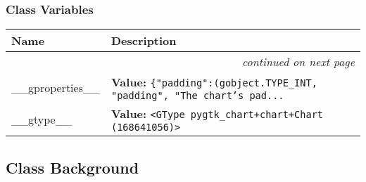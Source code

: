 
  \subsubsection{Class Variables}

    \vspace{-1cm}
\hspace{\varindent}\begin{longtable}{|p{\varnamewidth}|p{\vardescrwidth}|l}
\cline{1-2}
\cline{1-2} \centering \textbf{Name} & \centering \textbf{Description}& \\
\cline{1-2}
\endhead\cline{1-2}\multicolumn{3}{r}{\small\textit{continued on next page}}\\\endfoot\cline{1-2}
\endlastfoot\raggedright \_\-\_\-g\-p\-r\-o\-p\-e\-r\-t\-i\-e\-s\-\_\-\_\- & \raggedright \textbf{Value:} 
{\tt \{"padding":(gobject.TYPE\_INT, "padding", "The chart's pad\texttt{...}}&\\
\cline{1-2}
\raggedright \_\-\_\-g\-t\-y\-p\-e\-\_\-\_\- & \raggedright \textbf{Value:} 
{\tt {\textless}GType pygtk\_chart+chart+Chart (168641056){\textgreater}}&\\
\cline{1-2}
\end{longtable}



\subsection{Class Background}

